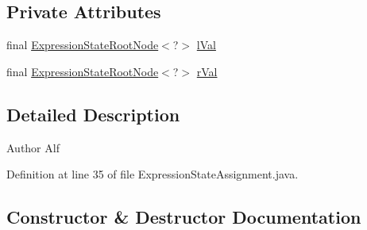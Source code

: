 \subsection*{Private Attributes}
\begin{DoxyCompactItemize}
\item 
final \hyperlink{interfacegov_1_1nasa_1_1jpf_1_1inspector_1_1server_1_1expression_1_1_expression_state_root_node}{Expression\+State\+Root\+Node}$<$?$>$ \hyperlink{classgov_1_1nasa_1_1jpf_1_1inspector_1_1server_1_1expression_1_1expressions_1_1_expression_state_assignment_ad6de82c2ceb7cfde3eda4788fc0068a4}{l\+Val}
\item 
final \hyperlink{interfacegov_1_1nasa_1_1jpf_1_1inspector_1_1server_1_1expression_1_1_expression_state_root_node}{Expression\+State\+Root\+Node}$<$?$>$ \hyperlink{classgov_1_1nasa_1_1jpf_1_1inspector_1_1server_1_1expression_1_1expressions_1_1_expression_state_assignment_ac9be8f4277f7f3747a3a6a2de5895d73}{r\+Val}
\end{DoxyCompactItemize}


\subsection{Detailed Description}
\begin{DoxyAuthor}{Author}
Alf 
\end{DoxyAuthor}


Definition at line 35 of file Expression\+State\+Assignment.\+java.



\subsection{Constructor \& Destructor Documentation}
